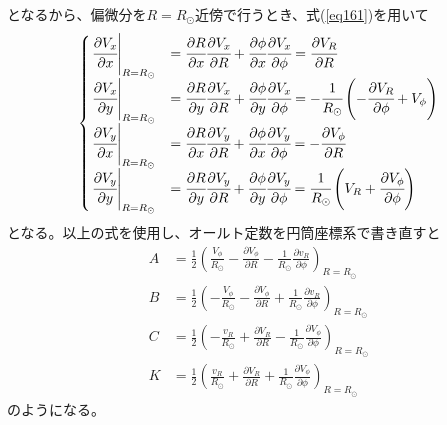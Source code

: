 となるから、偏微分を$R=R_{\odot}$近傍で行うとき、式(\ref{eq161})を用いて
\begin{align}
\begin{cases}
	\left.\cfrac{\partial V_x}{\partial x}\right|_{R=R_{\odot}} &= \cfrac{\partial R}{\partial x}\cfrac{\partial V_x}{\partial R} + \cfrac{\partial \phi}{\partial x}\cfrac{\partial V_x}{\partial \phi} = \cfrac{\partial V_R}{\partial R} \\[2mm]
	\left.\cfrac{\partial V_x}{\partial y}\right|_{R=R_{\odot}} &= \cfrac{\partial R}{\partial y}\cfrac{\partial V_x}{\partial R} + \cfrac{\partial \phi}{\partial y}\cfrac{\partial V_x}{\partial \phi} = -\cfrac{1}{R_{\odot}}\left(-\cfrac{\partial V_R}{\partial \phi} + V_{\phi}\right)\\[2mm]
	\left.\cfrac{\partial V_y}{\partial x}\right|_{R=R_{\odot}} &= \cfrac{\partial R}{\partial x}\cfrac{\partial V_y}{\partial R} + \cfrac{\partial \phi}{\partial x}\cfrac{\partial V_y}{\partial \phi} = -\cfrac{\partial V_{\phi}}{\partial R}\\[2mm]
	\left.\cfrac{\partial V_y}{\partial y}\right|_{R=R_{\odot}} &= \cfrac{\partial R}{\partial y}\cfrac{\partial V_y}{\partial R} + \cfrac{\partial \phi}{\partial y}\cfrac{\partial V_y}{\partial \phi} = \cfrac{1}{R_{\odot}}\left(V_R + \cfrac{\partial V_{\phi}}{\partial \phi}\right)
\end{cases}
\end{align}
となる。以上の式を使用し、オールト定数を円筒座標系で書き直すと
\begin{subequations}
\begin{align}
	A &=\frac{1}{2}\left( \frac{V_{\phi}}{R_{\odot}} - \frac{\partial V_{\phi}}{\partial R} - \frac{1}{R_{\odot}}\frac{\partial v_{R}}{\partial \phi} \right)_{R=R_{\odot}} \label{eq2.5a}\\
	B &=\frac{1}{2}\left( -\frac{V_{\phi}}{R_{\odot}} - \frac{\partial V_{\phi}}{\partial R} + \frac{1}{R_{\odot}}\frac{\partial v_{R}}{\partial \phi} \right)_{R=R_{\odot}} \label{eq2.5b}\\
	C &=\frac{1}{2}\left( -\frac{v_{R}}{R_{\odot}} + \frac{\partial V_R}{\partial R} - \frac{1}{R_{\odot}}\frac{\partial V_{\phi}}{\partial \phi} \right)_{R=R_{\odot}} \label{eq2.5c}\\
	K &=\frac{1}{2}\left( \frac{v_{R}}{R_{\odot}} + \frac{\partial V_R}{\partial R} + \frac{1}{R_{\odot}}\frac{\partial V_{\phi}}{\partial \phi} \right)_{R=R_{\odot}} \label{eq2.5d}
\end{align} \label{eq2.5}
\end{subequations}
のようになる。


